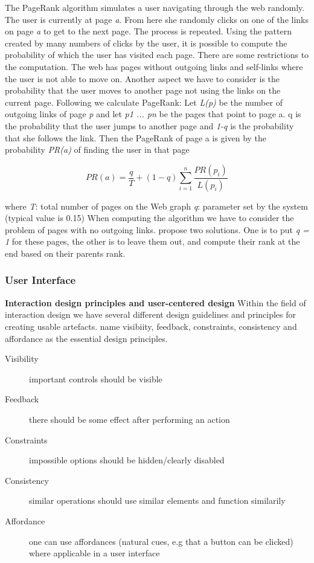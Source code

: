 The PageRank algorithm simulates a user navigating through the web randomly. The user is currently at page \emph{a}. From here she randomly clicks on one of the links on page \emph{a} to get to the next page. The process is repeated. Using the pattern created by many numbers of clicks by the user, it is possible to compute the probability of which the user has visited each page. There are some restrictions to the computation. The web has pages without outgoing links and self-links where the user is not able to move on. Another aspect we have to consider is the probability that the user moves to another page not using the links on the current page. Following we calculate PageRank:
Let \emph{L(p)} be the number of outgoing links of page \emph{p} and let \emph{p1 ... pn} be the pages that point to page a. q is the probability that the user jumps to another page and \emph{1-q} is the probability that she follows the link.  Then the PageRank of page a is given by the probability \emph{PR(a)} of finding the user in that page

\[
PR(a) = \frac{q}{T} + (1 − q) \sum_{i=1}^{n} \frac{PR(p_i)}{L(p_i)}
\]

where\newline
\emph{T}: total number of pages on the Web graph\newline
\emph{q}: parameter set by the system (typical value is 0.15) \newline
When computing the algorithm we have to consider the problem of pages with no outgoing links. \citet{Baeza-Yates2011} propose two solutions. One is to put \emph{q = 1} for these pages, the other is to leave them out, and compute their rank at the end based on their parents rank. 


\subsubsection{User Interface}

{\bf Interaction design principles and user-centered design}\newline
Within the field of interaction design we have several different design guidelines and principles for creating usable artefacts. \citet{Sharp2007} name visibiity, feedback, constraints, consistency and affordance as the essential design principles.

\begin{description}
  \item[Visibility] important controls should be visible
  \item[Feedback] there should be some effect after performing an action
  \item[Constraints] impossible options should be hidden/clearly disabled
  \item[Consistency] similar operations should use similar elements and function similarily
  \item[Affordance] one can use affordances (natural cues, e.g that a button can be clicked) where applicable in a user interface
\end{description}


